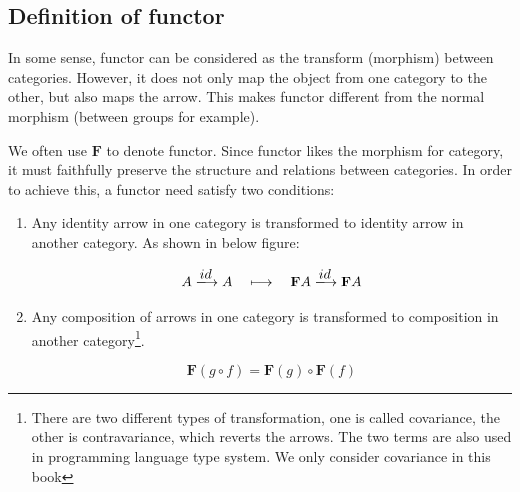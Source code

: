 \documentclass[b5paper]{article}
\begin{document}
\subsection{Definition of functor}
In some sense, functor can be considered as the transform (morphism) between categories. However, it does not only map the object from one category to the other, but also maps the arrow. This makes functor different from the normal morphism (between groups for example).

We often use $\mathbf{F}$ to denote functor. Since functor likes the morphism for category, it must faithfully preserve the structure and relations between categories. In order to achieve this, a functor need satisfy two conditions:

\begin{enumerate}
\item Any identity arrow in one category is transformed to identity arrow in another category. As shown in below figure:

\[
A \arrowto{id} A \quad \longmapsto \quad \mathbf{F}A \arrowto{id} \mathbf{F}A
\]

 
\item Any composition of arrows in one category is transformed to composition in another category\footnote{There are two different types of transformation, one is called covariance, the other is contravariance, which reverts the arrows. The two terms are also used in programming language type system. We only consider covariance in this book}.

\begin{center}
\end{center}

\[
\mathbf{F}(g \circ f) = \mathbf{F}(g) \circ \mathbf{F}(f)
\]
\end{enumerate}
\end{document}
